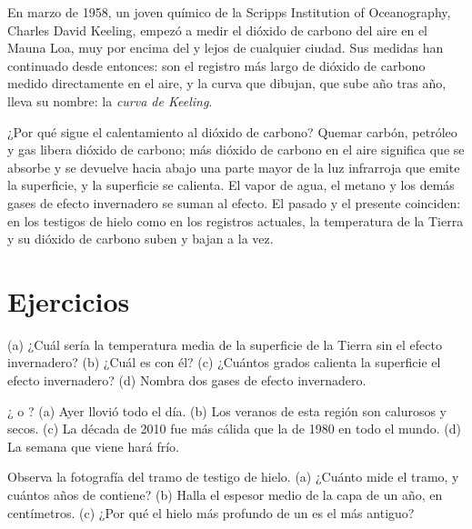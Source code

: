 \begin{history}
En marzo de 1958, un joven químico de la Scripps Institution of
Oceanography, Charles David Keeling, empezó a medir el dióxido de carbono
del aire en el Mauna Loa, muy por encima del  y lejos de cualquier
ciudad. Sus medidas han continuado desde entonces: son el registro más
largo de dióxido de carbono medido directamente en el aire, y la curva que
dibujan, que sube año tras año, lleva su nombre: la \emph{curva de
Keeling}.
\end{history}

¿Por qué sigue el calentamiento al dióxido de carbono? Quemar carbón,
petróleo y gas libera dióxido de carbono; más dióxido de carbono en el aire
significa que se absorbe y se devuelve hacia abajo una parte mayor de la
luz infrarroja que emite la superficie, y la superficie se calienta. El
vapor de agua, el metano y los demás gases de efecto invernadero se suman
al efecto. El pasado y el presente coinciden: en los testigos de hielo
como en los registros actuales, la temperatura de la Tierra y su dióxido
de carbono suben y bajan a la vez.

\section{Ejercicios}

\begin{exercise}[$\star$]\label{exo:g9:climate-past-and-present:1}
(a) ¿Cuál sería la temperatura media de la superficie de la Tierra sin el
efecto invernadero? (b) ¿Cuál es con él? (c) ¿Cuántos grados calienta la
superficie el efecto invernadero? (d) Nombra dos gases de efecto
invernadero.
\end{exercise}

\begin{exercise}[$\star$]\label{exo:g9:climate-past-and-present:2}
¿ o ? (a) Ayer llovió todo el día. (b) Los veranos de esta
región son calurosos y secos. (c) La década de 2010 fue más cálida que la
de 1980 en todo el mundo. (d) La semana que viene hará frío.
\end{exercise}

\begin{exercise}[$\star$]\label{exo:g9:climate-past-and-present:3}
Observa la fotografía del tramo de testigo de hielo. (a) ¿Cuánto mide el
tramo, y cuántos años de  contiene? (b) Halla el espesor medio de la
capa de un año, en centímetros. (c) ¿Por qué el hielo más profundo de un
 es el más antiguo?
\end{exercise}

